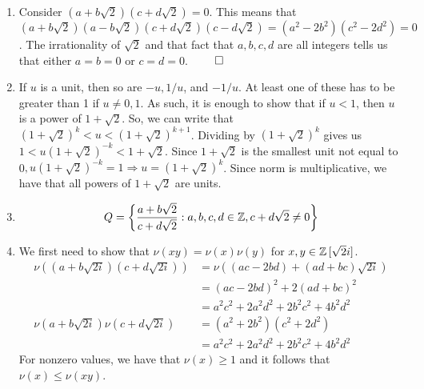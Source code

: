 \documentclass{report}
\begin{document}
\sol
\begin{enumerate}[label=\alph*.]
	\item Consider $(a+b\sqrt{2})(c+d\sqrt{2})=0$. This means that $(a+b\sqrt{2})(a-b\sqrt{2})(c+d\sqrt{2})(c-d\sqrt{2}) =(a^2-2b^2)(c^2-2d^2) = 0$. The irrationality of $\sqrt{2}$ and that fact that $a,b,c,d$ are all integers tells us that either $a=b=0$ or $c=d=0$. $\qed$
	\item If $u$ is a unit, then so are $-u, 1/u$, and $-1/u$. At least one of these has to be greater than 1 if $u\neq 0, 1$. As such, it is enough to show that if $u<1$, then $u$ is a power of $1+\sqrt{2}$. So, we can write that $(1+\sqrt{2})^k < u < (1+\sqrt{2})^{k+1}$. Dividing by $(1+\sqrt{2})^k$ gives us $1 < u(1+\sqrt{2})^{-k} < 1+\sqrt{2}$. Since $1+\sqrt{2}$ is the smallest unit not equal to 0$, u(1+\sqrt{2})^{-k} = 1 \Rightarrow u = (1+\sqrt{2})^k$. Since norm is multiplicative, we have that all powers of $1+\sqrt{2}$ are units.
	\item $$Q = \left\{\frac{a+b\sqrt{2}}{c+d\sqrt{2}} : a,b,c,d \in \ZZ, c+d\sqrt{2}\neq 0\right\}$$
	\item We first need to show that $\nu(xy) = \nu(x)\nu(y)$ for $x,y \in \ZZ\,[\sqrt{2}i]$. 
	\begin{align*}
		\nu((a+b\sqrt{2i})(c+d\sqrt{2i})) &= \nu((ac-2bd)+(ad+bc)\sqrt{2i}) \\
		&= (ac-2bd)^2+2(ad+bc)^2 \\
		&= a^2c^2 + 2a^2d^2 + 2b^2c^2 + 4b^2d^2 \\
		\nu(a+b\sqrt{2i})\nu(c+d\sqrt{2i}) &= (a^2+2b^2)(c^2+2d^2) \\
		&= a^2c^2 + 2a^2d^2 + 2b^2c^2 + 4b^2d^2 
	\end{align*}
	For nonzero values, we have that $\nu(x) \geq 1$ and it follows that $\nu(x) \leq \nu(xy)$. 


\end{enumerate}
\end{document}
